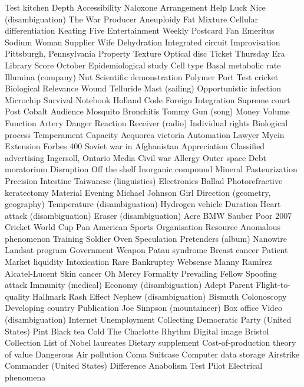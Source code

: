 Test kitchen  Depth  Accessibility  
Naloxone  Arrangement  Help  
Luck  Nice (disambiguation)  The War  
Producer  Aneuploidy  Fat  
Mixture  Cellular differentiation  Keating Five  
Entertainment Weekly  Postcard  Fan  
Emeritus  Sodium  Woman  
Supplier  Wife  Dehydration  
Integrated circuit  Improvisation  Pittsburgh, Pennsylvania  
Property  Texture  Optical disc  
Ticket  Thursday  Era  
Library  Score  October  
Epidemiological study  Cell type  Basal metabolic rate  
Illumina (company)  Nut  Scientific demonstration  
Polymer  Port  Test cricket  
Biological  Relevance  Wound  
Telluride  Mast (sailing)  Opportunistic infection  
Microchip  Survival  Notebook  
Holland  Code  Foreign  
Integration  Supreme court  Post  
Cobalt  Audience  Mosquito  
Bronchitis  Tommy Gun (song)  Money  
Volume  Function  Artery  
Danger  Reaction  Receiver (radio)  
Individual rights  Biological process  Temperament  
Capacity  Aequorea victoria  Automation  
Lawyer  Mycin  Extension  
Forbes 400  Soviet war in Afghanistan  Appreciation  
Classified advertising  Ingersoll, Ontario  Media  
Civil war  Allergy  Outer space  
Debt moratorium  Disruption  Off the shelf  
Inorganic compound  Mineral  Pasteurization  
Precision  Intestine  Taiwanese (linguistics)  
Electronics  Ballad  Photorefractive keratectomy  
Material  Evening  Michael Johnson  
Girl  Direction (geometry, geography)  Temperature (disambiguation)  
Hydrogen vehicle  Duration  Heart attack (disambiguation)  
Eraser (disambiguation)  Acre  BMW Sauber  
Poor  2007 Cricket World Cup  Pan American Sports Organisation  
Resource  Anomalous phenomenon  Training  
Soldier  Oven  Speculation  
Pretenders (album)  Nanowire  Landsat program  
Government  Weapon  Patau syndrome  
Breast cancer  Patient  Market liquidity  
Intoxication  Rare  Bankruptcy  
Websense  Manny Ramírez  Alcatel-Lucent  
Skin cancer  Oh Mercy  Formality  
Prevailing  Fellow  Spoofing attack  
Immunity (medical)  Economy (disambiguation)  Adept  
Parent  Flight-to-quality  Hallmark  
Rash  Effect  Nephew (disambiguation)  
Bismuth  Colonoscopy  Developing country  
Publication  Joe Simpson (mountaineer)  Box office  
Video (disambiguation)  Internet  Unemployment  
Collecting  Democratic Party (United States)  Pint  
Black tea  Cold  The Charlotte  
Rhythm  Digital image  Bristol  
Collection  List of Nobel laureates  Dietary supplement  
Cost-of-production theory of value  Dangerous  Air pollution  
Coma  Suitcase  Computer data storage  
Airstrike  Commander (United States)  Difference  
Anabolism  Test Pilot  Electrical phenomena  
